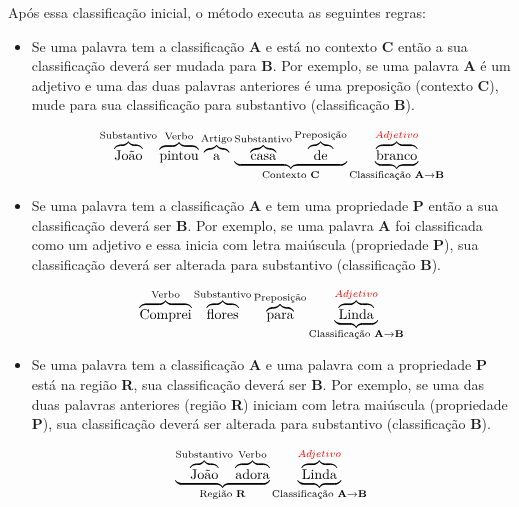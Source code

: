 Após essa classificação inicial, o método executa as seguintes regras:
\newpage
\begin{itemize}
   \item Se uma palavra tem a classificação \textbf{A} e está no contexto
  \textbf{C} então a sua classificação deverá ser mudada para \textbf{B}. Por
  exemplo, se uma palavra \textbf{A} é um adjetivo e uma das duas palavras
  anteriores é uma preposição (contexto \textbf{C}), mude para sua
  classificação para substantivo (classificação \textbf{B}).
  
  \[\overbrace{\text{João}}^\text{Substantivo}
  \overbrace{\text{pintou}}^\text{Verbo}
  \overbrace{\text{a}}^\text{Artigo}
  \underbrace{
  \overbrace{\text{casa}}^\text{Substantivo}
  \overbrace{\text{de}}^\text{Preposição}}_\text{Contexto \textbf{C}}
  \underbrace{\overbrace{\text{branco}}^{\textcolor{red}{Adjetivo}}}_\text{Classificação
  \textbf{A}\textrightarrow\textbf{B}}
 \]
 
  \item Se uma palavra tem a classificação \textbf{A} e tem uma propriedade
  \textbf{P} então a sua classificação deverá ser \textbf{B}. Por exemplo, se
  uma palavra \textbf{A} foi classificada como um adjetivo e essa inicia com
  letra maiúscula (propriedade \textbf{P}), sua classificação deverá ser
  alterada para substantivo (classificação \textbf{B}).
  
  \[\overbrace{\text{Comprei}}^\text{Verbo}
  \overbrace{\text{flores}}^\text{Substantivo}
  \overbrace{\text{para}}^\text{Preposição}
  \underbrace{\overbrace{\text{L}\text{inda}}^{\textcolor{red}{Adjetivo}}}_\text{Classificação
  \textbf{A}\textrightarrow\textbf{B}}
 \]
 
  \item Se uma palavra tem a classificação \textbf{A} e uma palavra com a
  propriedade \textbf{P} está na região \textbf{R}, sua classificação deverá
  ser \textbf{B}. Por exemplo, se uma das duas palavras anteriores (região
  \textbf{R}) iniciam com letra maiúscula (propriedade \textbf{P}), sua
  classificação deverá ser alterada para substantivo (classificação \textbf{B}).
  
   \[\underbrace{\overbrace{\text{João}}^\text{Substantivo}
  \overbrace{\text{adora}}^\text{Verbo}}_\text{Região \textbf{R}}
  \underbrace{\overbrace{\text{L}\text{inda}}^{\textcolor{red}{Adjetivo}}}_\text{Classificação
  \textbf{A}\textrightarrow\textbf{B}}
 \]
 
  
\end{itemize}

